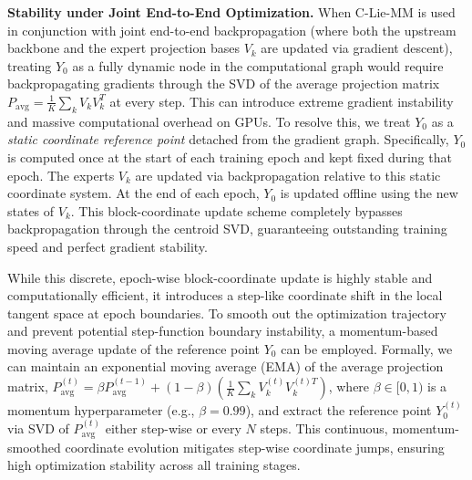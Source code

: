 \textbf{Stability under Joint End-to-End Optimization.} When C-Lie-MM is used in conjunction with joint end-to-end backpropagation (where both the upstream backbone and the expert projection bases $V_k$ are updated via gradient descent), treating $Y_0$ as a fully dynamic node in the computational graph would require backpropagating gradients through the SVD of the average projection matrix $P_{\text{avg}} = \frac{1}{K} \sum_k V_k V_k^T$ at every step. This can introduce extreme gradient instability and massive computational overhead on GPUs. To resolve this, we treat $Y_0$ as a \emph{static coordinate reference point} detached from the gradient graph. Specifically, $Y_0$ is computed once at the start of each training epoch and kept fixed during that epoch. The experts $V_k$ are updated via backpropagation relative to this static coordinate system. At the end of each epoch, $Y_0$ is updated offline using the new states of $V_k$. This block-coordinate update scheme completely bypasses backpropagation through the centroid SVD, guaranteeing outstanding training speed and perfect gradient stability.

While this discrete, epoch-wise block-coordinate update is highly stable and computationally efficient, it introduces a step-like coordinate shift in the local tangent space at epoch boundaries. To smooth out the optimization trajectory and prevent potential step-function boundary instability, a momentum-based moving average update of the reference point $Y_0$ can be employed. Formally, we can maintain an exponential moving average (EMA) of the average projection matrix, $P_{\text{avg}}^{(t)} = \beta P_{\text{avg}}^{(t-1)} + (1 - \beta) \left( \frac{1}{K} \sum_k V_k^{(t)} V_k^{(t)T} \right)$, where $\beta \in [0, 1)$ is a momentum hyperparameter (e.g., $\beta = 0.99$), and extract the reference point $Y_0^{(t)}$ via SVD of $P_{\text{avg}}^{(t)}$ either step-wise or every $N$ steps. This continuous, momentum-smoothed coordinate evolution mitigates step-wise coordinate jumps, ensuring high optimization stability across all training stages.

